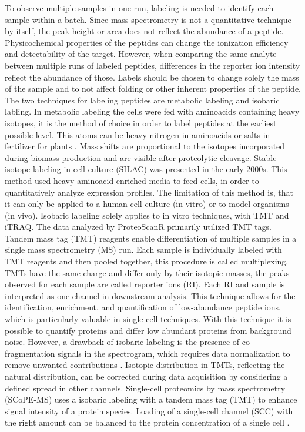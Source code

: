 \documentclass[
  11pt,
]{article}
\begin{document}
To observe multiple samples in one run, labeling is needed to identify each sample within a batch.
Since mass spectrometry is not a quantitative technique by itself, the peak height or area does not reflect the abundance of a peptide. Physicochemical properties of the peptides can change the ionization efficiency and detectability of the target. However, when comparing the same analyte between multiple runs of labeled peptides, differences in the reporter ion intensity reflect the abundance of those. Labels should be chosen to change solely the mass of the sample and to not affect folding or other inherent properties of the peptide. The two techniques for labeling peptides are metabolic labeling and isobaric labling. In metabolic labeling the cells were fed with aminoacids containing heavy isotopes, it is the method of choice in order to label peptides at the earliest possible level. This atoms can be heavy nitrogen in aminoacids or salts in fertilizer for plants \citep{Karen2012}. Mass shifts are proportional to the isotopes incorporated during biomass production and are visible after proteolytic cleavage. Stable isotope labeling in cell culture (SILAC) was presented in the early 2000s. This method used heavy aminoacid enriched media to feed cells, in order to quantitatively analyze expression profiles. The limitation of this method is, that it can only be applied to a human cell culture (in vitro) or to model organisms (in vivo).
Isobaric labeling solely applies to in vitro techniques, with TMT and iTRAQ. The data analyzed by ProteoScanR primarily utilized TMT tags. Tandem mass tag (TMT) reagents enable differentiation of multiple samples in a single mass spectrometry (MS) run. Each sample is individually labeled with TMT reagents and then pooled together, this procedure is called multiplexing. TMTs have the same charge and differ only by their isotopic masses, the peaks observed for each sample are called reporter ions (RI). Each RI and sample is interpreted as one channel in downstream analysis. This technique allows for the identification, enrichment, and quantification of low-abundance peptide ions, which is particularly valuable in single-cell techniques. With this technique it is possible to quantify proteins and differ low abundant proteins from background noise. However, a drawback of isobaric labeling is the presence of co-fragmentation signals in the spectrogram, which requires data normalization to remove unwanted contributions \citep{Marx2019, Budnik2018}. Isotopic distribution in TMTs, reflecting the natural distribution, can be corrected during data acquisition by considering a defined spread in other channels. Single-cell proteomics by mass spectrometry (SCoPE-MS) uses a isobaric labeling with a tandem mass tag (TMT) to enhance signal intensity of a protein species. Loading of a single-cell channel (SCC) with the right amount can be balanced to the protein concentration of a single cell \citep{Ye2022}.
\end{document}
